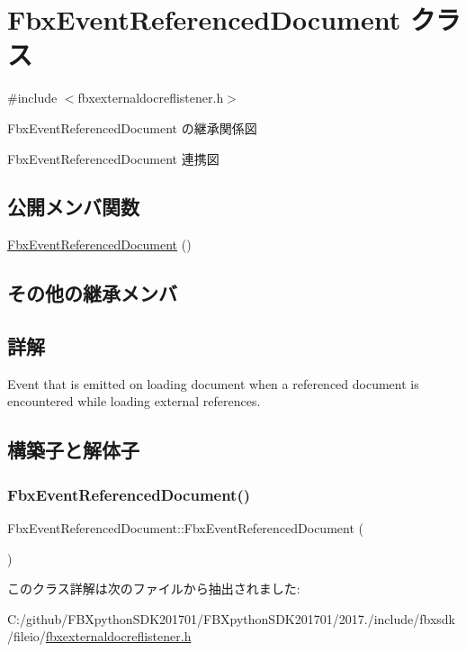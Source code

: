 \hypertarget{class_fbx_event_referenced_document}{}\section{Fbx\+Event\+Referenced\+Document クラス}
\label{class_fbx_event_referenced_document}


{\ttfamily \#include $<$fbxexternaldocreflistener.\+h$>$}



Fbx\+Event\+Referenced\+Document の継承関係図


Fbx\+Event\+Referenced\+Document 連携図
\subsection*{公開メンバ関数}
\begin{DoxyCompactItemize}
\item 
\hyperlink{class_fbx_event_referenced_document_a573464a1bcb1982f0f83bee571e35d79}{Fbx\+Event\+Referenced\+Document} ()
\end{DoxyCompactItemize}
\subsection*{その他の継承メンバ}


\subsection{詳解}
Event that is emitted on loading document when a referenced document is encountered while loading external references. 

\subsection{構築子と解体子}
\mbox{\label{class_fbx_event_referenced_document_a573464a1bcb1982f0f83bee571e35d79}} 
\subsubsection{\texorpdfstring{Fbx\+Event\+Referenced\+Document()}{FbxEventReferencedDocument()}}
{\footnotesize\ttfamily Fbx\+Event\+Referenced\+Document\+::\+Fbx\+Event\+Referenced\+Document (\begin{DoxyParamCaption}{ }\end{DoxyParamCaption})}



このクラス詳解は次のファイルから抽出されました\+:\begin{DoxyCompactItemize}
\item 
C\+:/github/\+F\+B\+Xpython\+S\+D\+K201701/\+F\+B\+Xpython\+S\+D\+K201701/2017./include/fbxsdk/fileio/\hyperlink{fbxexternaldocreflistener_8h}{fbxexternaldocreflistener.\+h}\end{DoxyCompactItemize}
